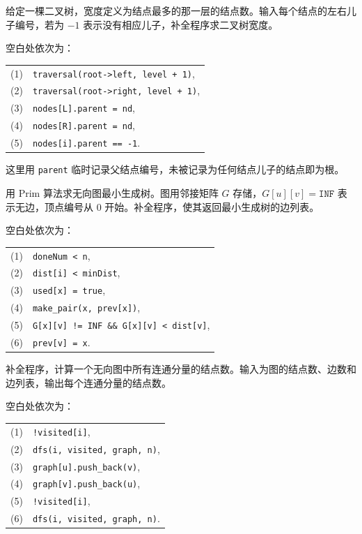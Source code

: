 \begin{question}[二叉树宽度]
给定一棵二叉树，宽度定义为结点最多的那一层的结点数。输入每个结点的左右儿子编号，若为 $-1$ 表示没有相应儿子，补全程序求二叉树宽度。
\begin{solution}
空白处依次为：
\begin{center}
\small
\begin{tabular}{@{}r l@{}}
(1)&\texttt{traversal(root->left, level + 1)},\\
(2)&\texttt{traversal(root->right, level + 1)},\\
(3)&\texttt{nodes[L].parent = nd},\\
(4)&\texttt{nodes[R].parent = nd},\\
(5)&\texttt{nodes[i].parent == -1}.
\end{tabular}
\end{center}
这里用 \texttt{parent} 临时记录父结点编号，未被记录为任何结点儿子的结点即为根。
\end{solution}
\end{question}

\begin{question}[Prim 算法]
用 Prim 算法求无向图最小生成树。图用邻接矩阵 $G$ 存储，$G[u][v]=\texttt{INF}$ 表示无边，顶点编号从 $0$ 开始。补全程序，使其返回最小生成树的边列表。
\begin{solution}
空白处依次为：
\begin{center}
\small
\begin{tabular}{@{}r l@{}}
(1)&\texttt{doneNum < n},\\
(2)&\texttt{dist[i] < minDist},\\
(3)&\texttt{used[x] = true},\\
(4)&\texttt{make\_pair(x, prev[x])},\\
(5)&\texttt{G[x][v] != INF \&\& G[x][v] < dist[v]},\\
(6)&\texttt{prev[v] = x}.
\end{tabular}
\end{center}
\end{solution}
\end{question}

\begin{question}[连通分量大小]
补全程序，计算一个无向图中所有连通分量的结点数。输入为图的结点数、边数和边列表，输出每个连通分量的结点数。
\begin{solution}
空白处依次为：
\begin{center}
\small
\begin{tabular}{@{}r l@{}}
(1)&\texttt{!visited[i]},\\
(2)&\texttt{dfs(i, visited, graph, n)},\\
(3)&\texttt{graph[u].push\_back(v)},\\
(4)&\texttt{graph[v].push\_back(u)},\\
(5)&\texttt{!visited[i]},\\
(6)&\texttt{dfs(i, visited, graph, n)}.
\end{tabular}
\end{center}
\end{solution}
\end{question}

